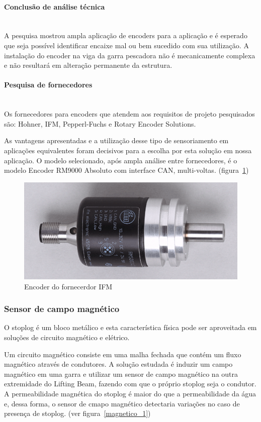  \paragraph{Conclusão de análise técnica}\mbox{}\\
A pesquisa mostrou ampla aplicação de encoders para a aplicação e é esperado que seja possível identificar encaixe mal ou bem sucedido com sua utilização. A instalação do encoder na viga da garra pescadora não é mecanicamente complexa e não resultará em alteração permanente da estrutura.

 \paragraph{Pesquisa de fornecedores}\mbox{}\\
Os fornecedores para encoders que atendem aos requisitos de projeto pesquisados são: Hohner, IFM, Pepperl-Fuchs e Rotary Encoder Solutions.

As vantagens apresentadas e a utilização desse tipo de sensoriamento em
aplicações equivalentes foram decisivos para a escolha por esta solução em nossa
aplicação. O modelo selecionado, após ampla análise entre fornecedores, é o
modelo Encoder RM9000 Absoluto com interface CAN, multi-voltas.
(figura~\ref{encoder_1})

\begin{figure}[H]
    \centering
    \includegraphics[width=0.4\columnwidth]{figs/encoder/1.png}
    \caption{Encoder do fornecerdor IFM}
    \label{encoder_1}
\end{figure}

\subsubsection{Sensor de campo magnético}
O stoplog é um bloco metálico e esta característica física pode ser aproveitada em soluções de circuito magnético e elétrico.

Um circuito magnético consiste em uma malha fechada que contém um fluxo magnético através de condutores. A solução estudada é induzir um campo magnético em uma garra e utilizar um sensor de campo magnético na outra extremidade do Lifting Beam, fazendo com que o próprio stoplog seja o condutor. A permeabilidade magnética do stoplog é maior do que a permeabilidade da água e, dessa forma, o sensor de cmapo magnético detectaria variações no caso de presença de stoplog. (ver figura~\ref{magnetico_1})


